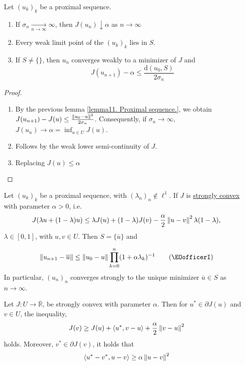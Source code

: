 \begin{theorem}
	Let $(u_k)_k$ be a proximal sequence.
	
	\begin{enumerate}
		\item If $\sigma_n \xrightarrow[n\rightarrow\infty]{}\infty$, then $J(u_n) \downarrow \alpha$ as $n\rightarrow \infty$
		\item Every weak limit point of the $(u_k)_k$ lies in $S$.
		\item  If $S\neq\{\}$, then $u_n$ converges weakly to a minimizer of $J$ and 
		\[
			J(u_{n+1}) - \alpha \leq \frac{\mathrm{d}(u_0, S)}{2 \sigma_n}
		\]
	\end{enumerate}
	\begin{proof} \
		\begin{enumerate}

		\item 		By the previous lemma \eqref{lemma11. Proximal sequence.}, we obtain $J(u_{n+1})-J(u) \leq \frac{\left\lVert u_0-u\right\rVert^2}{2\sigma_n}$. Consequently, if $\sigma_n \rightarrow \infty$, $J(u_n)\rightarrow \alpha = \inf_{u\in U } J(u)$.
		\item Follows by the weak lower semi-continuity of $J$.
		\item Replacing $J(u)\leq \alpha$
		\end{enumerate}
	\end{proof}
\end{theorem}

\begin{theorem}
	Let $(u_k)_k$ be a proximal sequence, with $(\lambda_n)_n \notin \ell^1$. If $J$ is \underline{strongly convex} with parameter $\alpha > 0$, i.e. \[J(\lambda u + (1-\lambda)u) \leq \lambda J(u)+ (1-\lambda) J(v) -\frac{\alpha}{2} \left\lVert u-v\right\rVert^2\lambda (1-\lambda),\] $\lambda \in [0,1]$, with $u,v \in U$. Then $S=\{\overline{u}\}$ and 
	
	\begin{equation}
		\label{eq11. Ineq Prod.}\norm{u_{n+1}-\overline{u}} \leq \norm{u_0-u} \prod_{k=0}^{n} (1+\alpha \lambda_k)^{-1} \tag{\EOofficerI}
	\end{equation}
	In particular, $(u_n)_n$ converges strongly to the unique minimizer $\overline{u} \in S$ as $n\rightarrow \infty$.
\end{theorem}

\begin{lemma}
	Let $J:U\rightarrow \overline{\mathbb{R}}$, be strongly convex with parameter $\alpha$. Then for $u^* \in \partial J(u)$ and $v\in U$, the inequality,
	\begin{align*}
		J(v)\geq J(u)+\langle u^*, v-u\rangle +\frac{\alpha}{2}\left\lVert v-u\right\rVert^2
	\end{align*}
	holds. Moreover, $v^* \in \partial J(v)$, it holds that 
	\begin{equation*}
		\langle u^*-v^*, u-v\rangle \geq \alpha \left\lVert u-v\right\rVert^2
	\end{equation*}
\end{lemma}

